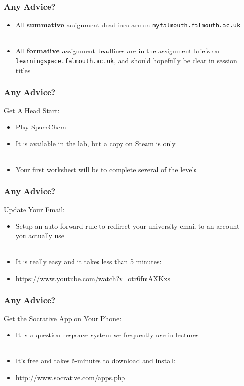 \begin{frame}
	\frametitle{Any Advice?}	
	
	\begin{itemize}
		\item All \textbf{summative} assignment deadlines are on \texttt{myfalmouth.falmouth.ac.uk}
		\\~\\
		\item All \textbf{formative} assignment deadlines are in the assignment briefs on \texttt{learningspace.falmouth.ac.uk}, and should hopefully be clear in session titles
	\end{itemize}
\end{frame}


\begin{frame}
	\frametitle{Any Advice?}	
	
	Get A Head Start:
	
	\begin{itemize}
		\item Play SpaceChem
		\item It is available in the lab, but a copy on Steam is only 
		\\~\\
		\item Your first worksheet will be to complete several of the levels
	\end{itemize}
\end{frame}

\begin{frame}
	\frametitle{Any Advice?}	
	
	Update Your Email:
	
	\begin{itemize}
		\item Setup an auto-forward rule to redirect your university email to an account you actually use
		\\~\\
		\item It is really easy and it takes less than 5 minutes:
		\item \url{https://www.youtube.com/watch?v=otr6fmAXKxs}
	\end{itemize}
\end{frame}

\begin{frame}
	\frametitle{Any Advice?}	
	
	Get the Socrative App on Your Phone:
	
	\begin{itemize}
		\item It is a question response system we frequently use in lectures
		\\~\\
		\item It's free and takes 5-minutes to download and install:
		\item \url{http://www.socrative.com/apps.php}
	\end{itemize}
\end{frame}

